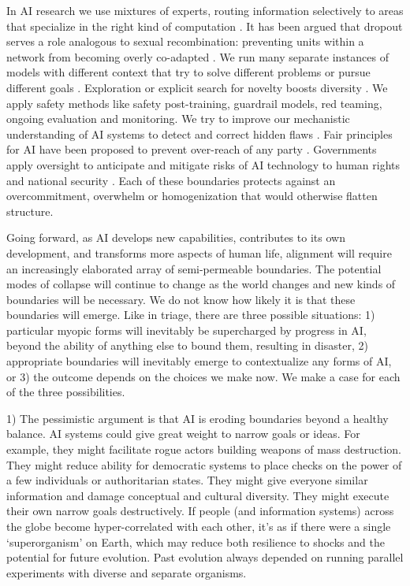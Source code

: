 \documentclass[11pt]{article}
\begin{document}
In AI research we use mixtures of experts, routing information selectively to areas that specialize in the right kind of computation \citep{shazeer2017outrageously}. It has been argued that dropout serves a role analogous to sexual recombination: preventing units within a network from becoming overly co-adapted \citep{srivastava2014dropout}. We run many separate instances of models with different context that try to solve different problems or pursue different goals \citep{hammond2025multi, guo2024large, qian2024chatdev}. Exploration or explicit search for novelty boosts diversity \citep{lehman2011abandoning, bellemare2016unifying, pathak2017curiosity, schwartenbeck2013exploration}. We apply safety methods like safety post-training, guardrail models, red teaming, ongoing evaluation and monitoring. We try to improve our mechanistic understanding of AI systems to detect and correct hidden flaws \citep{olah2020zoom, burns2022discovering, bereska2024mechanistic, anthropic2024mapping}. Fair principles for AI have been proposed to prevent over-reach of any party \citep{gabriel2025matter}. Governments apply oversight to anticipate and mitigate risks of AI technology to human rights and national security \citep{eu2024aiact, uk2023bletchley, us2023eo14110}. Each of these boundaries protects against an overcommitment, overwhelm or homogenization that would otherwise flatten structure.

Going forward, as AI develops new capabilities, contributes to its own development, and transforms more aspects of human life, alignment will require an increasingly elaborated array of semi-permeable boundaries. The potential modes of collapse will continue to change as the world changes and new kinds of boundaries will be necessary. We do not know how likely it is that these boundaries will emerge. Like in triage, there are three possible situations: 1) particular myopic forms will inevitably be supercharged by progress in AI, beyond the ability of anything else to bound them, resulting in disaster, 2) appropriate boundaries will inevitably emerge to contextualize any forms of AI, or 3) the outcome depends on the choices we make now. We make a case for each of the three possibilities.

1) The pessimistic argument is that AI is eroding boundaries beyond a healthy balance. AI systems could give great weight to narrow goals or ideas. For example, they might facilitate rogue actors building weapons of mass destruction. They might reduce ability for democratic systems to place checks on the power of a few individuals or authoritarian states. They might give everyone similar information and damage conceptual and cultural diversity. They might execute their own narrow goals destructively. If people (and information systems) across the globe become hyper-correlated with each other, it's as if there were a single `superorganism' on Earth, which may reduce both resilience to shocks and the potential for future evolution. Past evolution always depended on running parallel experiments with diverse and separate organisms. 
\end{document}

